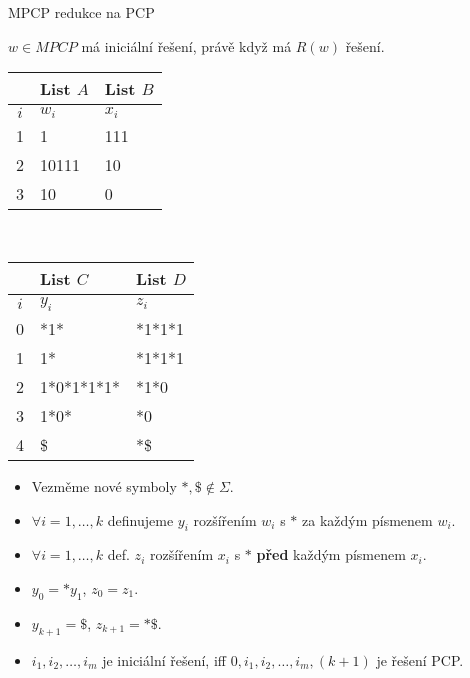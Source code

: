     \begin{frame}{MPCP redukce na PCP}
    \vspace{-0.5cm}
    \begin{minipage}{0.45\textwidth}
    \begin{lemmaN}\label{lemMPCA}
    $w\in MPCP$ má iniciální řešení, právě když má $R(w)$ řešení.
    \end{lemmaN}
    \begin{tabular}{c | l | l}
     & List $A$ & List $B$\\
    \hline
    $i$ & $w_i$ & $x_i$ \\
    \hline
    1 & 1 & 111\\
    2 & 10111 & 10\\
    3 & 10 & 0 
    \end{tabular}
    \end{minipage}
    \begin{minipage}{0.01\textwidth}
    \ \end{minipage}
    \pause
    \begin{minipage}{0.52\textwidth}
    \begin{example}
    \begin{tabular}{c | l | l}
     & List $C$ & List $D$\\
    \hline
    $i$ & $y_i$ & $z_i$ \\
    \hline
    0 & *1* & *1*1*1\\
    1 & 1* & *1*1*1\\
    2 & 1*0*1*1*1* & *1*0\\
    3 & 1*0* & *0\\
    4 & \$ & *\$ 
    \end{tabular}
    \end{example}
    \end{minipage}
    \begin{proofm}{}
    \begin{itemize}[<+->]
        \item Vezměme nové symboly $*,\$\notin \Sigma$.
        \item  $\forall i=1,\ldots,k$ definujeme $y_i$ rozšířením $w_i$ s $*$ za každým písmenem $w_i$.
        \item  $\forall i=1,\ldots,k$ def. $z_i$ rozšířením $x_i$ s $*$ \textbf{před} každým písmenem $x_i$.
        \item $y_0=*y_1$, $z_0=z_1$.
        \item $y_{k+1}=\$$, $z_{k+1}=*\$$.
        \item ${i_1}, {i_2}, \ldots, {i_m}$ je iniciální řešení, iff $0,{i_1}, {i_2}, \ldots, {i_m},(k+1)$ je řešení PCP.
    \end{itemize}
    \end{proofm}
    \end{frame}
    
